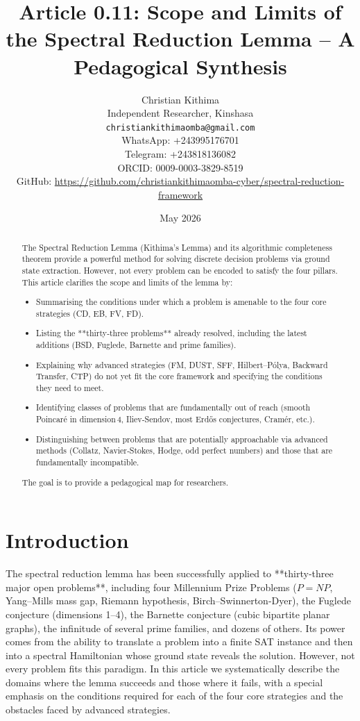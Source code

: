 \documentclass[11pt,a4paper]{article}
\title{Article 0.11: Scope and Limits of the Spectral Reduction Lemma – A Pedagogical Synthesis}
\author{Christian Kithima \\
Independent Researcher, Kinshasa \\
\texttt{christiankithimaomba@gmail.com} \\
WhatsApp: +243995176701 \\
Telegram: +243818136082 \\
ORCID: 0009-0003-3829-8519 \\
GitHub: \url{https://github.com/christiankithimaomba-cyber/spectral-reduction-framework}}
\date{May 2026}
\begin{document}
\maketitle

\begin{abstract}
The Spectral Reduction Lemma (Kithima's Lemma) and its algorithmic completeness theorem provide a powerful method for solving discrete decision problems via ground state extraction. However, not every problem can be encoded to satisfy the four pillars. This article clarifies the scope and limits of the lemma by:
\begin{itemize}
\item Summarising the conditions under which a problem is amenable to the four core strategies (CD, EB, FV, FD).
\item Listing the **thirty‑three problems** already resolved, including the latest additions (BSD, Fuglede, Barnette and prime families).
\item Explaining why advanced strategies (FM, DUST, SFF, Hilbert–Pólya, Backward Transfer, CTP) do not yet fit the core framework and specifying the conditions they need to meet.
\item Identifying classes of problems that are fundamentally out of reach (smooth Poincaré in dimension 4, Iliev‑Sendov, most Erdős conjectures, Cramér, etc.).
\item Distinguishing between problems that are potentially approachable via advanced methods (Collatz, Navier‑Stokes, Hodge, odd perfect numbers) and those that are fundamentally incompatible.
\end{itemize}
The goal is to provide a pedagogical map for researchers.
\end{abstract}

\tableofcontents

\section{Introduction}

The spectral reduction lemma has been successfully applied to **thirty‑three major open problems**, including four Millennium Prize Problems (\(P = NP\), Yang–Mills mass gap, Riemann hypothesis, Birch–Swinnerton-Dyer), the Fuglede conjecture (dimensions 1–4), the Barnette conjecture (cubic bipartite planar graphs), the infinitude of several prime families, and dozens of others. Its power comes from the ability to translate a problem into a finite SAT instance and then into a spectral Hamiltonian whose ground state reveals the solution. However, not every problem fits this paradigm. In this article we systematically describe the domains where the lemma succeeds and those where it fails, with a special emphasis on the conditions required for each of the four core strategies and the obstacles faced by advanced strategies.
\end{document}
